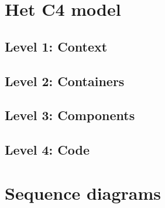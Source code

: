 
\section{Het C4 model}\label{sec:ch6-het-c4-model}

\subsection{Level 1: Context}\label{subsec:ch6-level-1-context}
\subsection{Level 2: Containers}\label{subsec:ch6-level-2-containers}
\subsection{Level 3: Components}\label{subsec:ch6-level-3-components}
\subsection{Level 4: Code}\label{subsec:ch6-level-4-code}

\section{Sequence diagrams}\label{sec:ch6-sequence-diagrams}